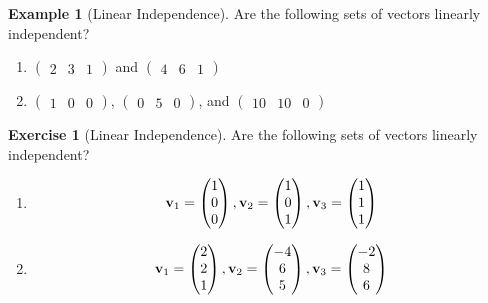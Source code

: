 \documentclass[
]{book}
\providecommand{\tightlist}{%
  \setlength{\itemsep}{0pt}\setlength{\parskip}{0pt}}
\theoremstyle{definition}
\theoremstyle{definition}
\newtheorem{example}{Example}[chapter]
\theoremstyle{definition}
\newtheorem{exercise}{Exercise}[chapter]
\theoremstyle{definition}
\theoremstyle{remark}
\begin{document}
\begin{example}[Linear Independence]
\protect\hypertarget{exm:linearindep}{}{\label{exm:linearindep} {} }
Are the following sets of vectors linearly independent?

\begin{enumerate}
\def\labelenumi{\arabic{enumi}.}
\tightlist
\item
  \(\begin{pmatrix}2 & 3 & 1 \end{pmatrix}\) and \(\begin{pmatrix}4 & 6 & 1 \end{pmatrix}\)
\item
  \(\begin{pmatrix}1 & 0 & 0 \end{pmatrix}\), \(\begin{pmatrix}0 & 5 & 0 \end{pmatrix}\), and \(\begin{pmatrix}10 & 10 & 0 \end{pmatrix}\)
\end{enumerate}
\end{example}

\begin{exercise}[Linear Independence]
\protect\hypertarget{exr:linearindep1}{}{\label{exr:linearindep1} {} }
Are the following sets of vectors linearly independent?

\begin{enumerate}
\def\labelenumi{\arabic{enumi}.}
\item
  \[{\bf v}_1 = \begin{pmatrix} 1 \\ 0 \\ 0 \end{pmatrix} , {\bf v}_2 = \begin{pmatrix} 1 \\ 0 \\ 1 \end{pmatrix} , {\bf v}_3 = \begin{pmatrix} 1 \\ 1 \\ 1 \end{pmatrix} \]
\item
  \[{\bf v}_1 = \begin{pmatrix} 2 \\ 2 \\ 1 \end{pmatrix} , {\bf v}_2 = \begin{pmatrix} -4 \\ 6 \\ 5 \end{pmatrix} , {\bf v}_3 = \begin{pmatrix} -2 \\ 8 \\ 6 \end{pmatrix} \]
\end{enumerate}
\end{exercise}
\end{document}
